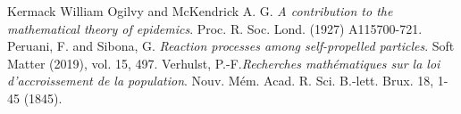 \documentclass[11pt]{amsart}
\numberwithin{equation}{section}
\theoremstyle{definition}
\theoremstyle{remark}
\renewcommand{\_}[1]{_{\left( #1 \right)}}
\renewcommand{\^}[1]{^{\left( #1 \right)}}
\begin{document}
\begin{thebibliography}{MPP}
	 Kermack William Ogilvy and McKendrick A. G. \emph{A contribution to the mathematical theory of epidemics}. Proc. R. Soc. Lond. (1927) A115700-721.
	 Peruani, F. and Sibona, G.  \emph{Reaction processes among self-propelled particles}. Soft Matter (2019), vol. 15, 497.
	 Verhulst, P.-F.\emph{Recherches math\'ematiques sur la loi d'accroissement de la population}. Nouv. M\'em. Acad. R. Sci. B.-lett. Brux. 18, 1-45 (1845).
\end{thebibliography}
\end{document}
